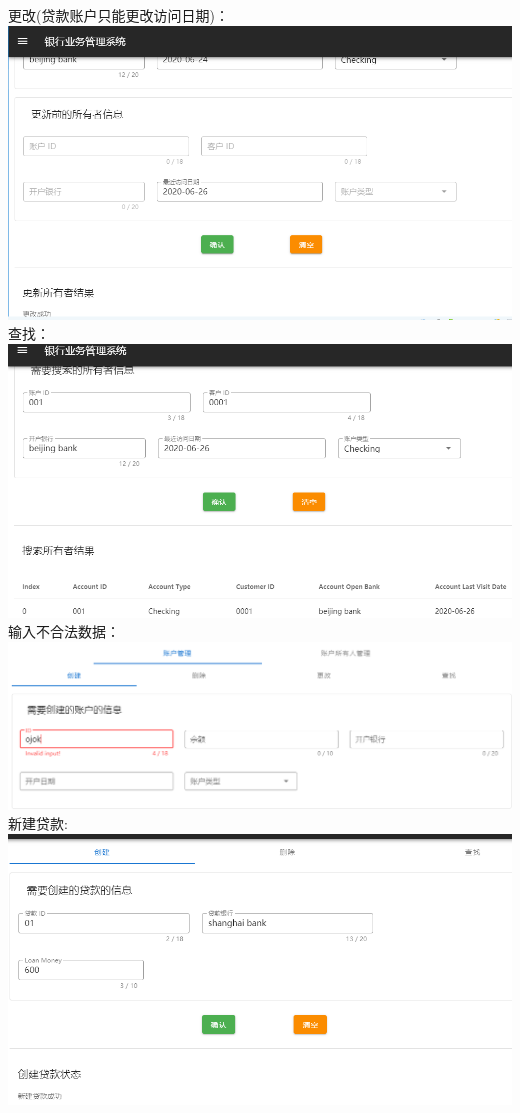 \documentclass{article}
\begin{document}
	更改(贷款账户只能更改访问日期)：\\
	\includegraphics*[scale=0.4]{10.png}\\
	查找：\\
	\includegraphics*[scale=0.4]{11.png}\\
	输入不合法数据：\\
	\includegraphics*[scale=0.4]{12.png}\\
	新建贷款:\\
	\includegraphics*[scale=0.4]{13.png}\\
\end{document}
